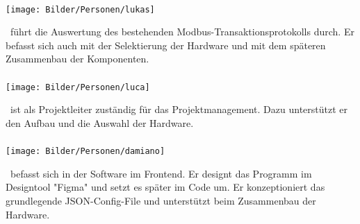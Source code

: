 \paragraph{\fenkart}
\begin{minipage}{0.37\textwidth}
	\centering
	\texttt{[image: Bilder/Personen/lukas]}
\end{minipage}
\hfill
\begin{minipage}{0.6\textwidth}
    \fenkart \ führt die Auswertung des bestehenden Modbus-Transaktionsprotokolls durch. Er befasst sich auch mit der Selektierung der Hardware und mit dem späteren Zusammenbau der Komponenten.
\end{minipage}%
\vspace{1ex}

\paragraph{\mangeng}
\begin{minipage}{0.37\textwidth}
	\centering
	\texttt{[image: Bilder/Personen/luca]}
\end{minipage}
\hfill
\begin{minipage}{0.6\textwidth}
     \mangeng \ ist als Projektleiter zuständig für das Projektmanagement. Dazu unterstützt er den Aufbau und die Auswahl der Hardware.
\end{minipage}%
\vspace{1ex}

\paragraph{\pezze}
\begin{minipage}{0.37\textwidth}
	\centering
	\texttt{[image: Bilder/Personen/damiano]}
\end{minipage}
\hfill
\begin{minipage}{0.6\textwidth}
    \pezze \ befasst sich in der Software im Frontend. Er designt das Programm im Designtool "Figma" und setzt es später im Code um. Er konzeptioniert das grundlegende JSON-Config-File und unterstützt beim Zusammenbau der Hardware. 

\end{minipage}%
\vspace{1ex}

